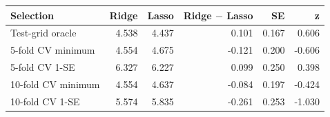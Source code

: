 \begin{center}
\small
\setlength{\tabcolsep}{4pt}
\begin{tabular}{lrrrrr}
\toprule
Selection & Ridge & Lasso & Ridge $-$ Lasso & SE & z \\
\midrule
Test-grid oracle & 4.538 & 4.437 & 0.101 & 0.167 & 0.606 \\
5-fold CV minimum & 4.554 & 4.675 & -0.121 & 0.200 & -0.606 \\
5-fold CV 1-SE & 6.327 & 6.227 & 0.099 & 0.250 & 0.398 \\
10-fold CV minimum & 4.554 & 4.637 & -0.084 & 0.197 & -0.424 \\
10-fold CV 1-SE & 5.574 & 5.835 & -0.261 & 0.253 & -1.030 \\
\bottomrule
\end{tabular}
\end{center}
